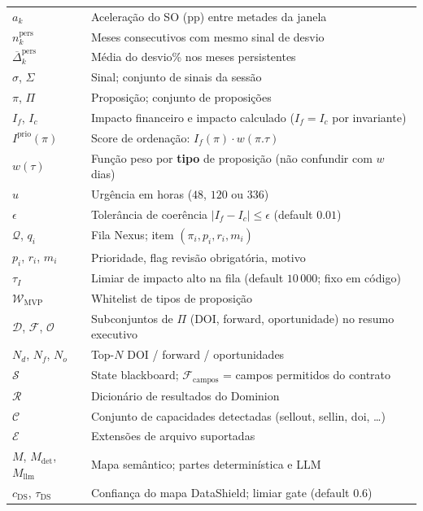 \documentclass[a4paper, 12pt]{report}
\theoremstyle{definition}
\theoremstyle{remark}
\newcommand{\state}{\mathcal{S}}
\newcommand{\fila}{\mathcal{Q}}
\begin{document}
\begin{longtable}{lp{9.5cm}}
  $a_k$ & Acelera\c{c}\~ao do SO (pp) entre metades da janela \\
  $n^{\text{pers}}_k$ & Meses consecutivos com mesmo sinal de desvio \\
  $\overline{\Delta}^{\text{pers}}_k$ & M\'edia do desvio\% nos meses persistentes \\
  $\sigma$, $\Sigma$ & Sinal; conjunto de sinais da sess\~ao \\
  $\pi$, $\Pi$ & Proposi\c{c}\~ao; conjunto de proposi\c{c}\~oes \\
  $I_f$, $I_c$ & Impacto financeiro e impacto calculado ($I_f = I_c$ por invariante) \\
  $I^{\text{prio}}(\pi)$ & Score de ordena\c{c}\~ao: $I_f(\pi)\cdot w(\pi.\tau)$ \\
  $w(\tau)$ & Fun\c{c}\~ao peso por \textbf{tipo} de proposi\c{c}\~ao (n\~ao confundir com $w$ dias) \\
  $u$ & Urg\^encia em horas ($48$, $120$ ou $336$) \\
  $\epsilon$ & Toler\^ancia de coer\^encia $|I_f-I_c|\leq\epsilon$ (default $0.01$) \\
  $\fila$, $q_i$ & Fila Nexus; item $(\pi_i, p_i, r_i, m_i)$ \\
  $p_i$, $r_i$, $m_i$ & Prioridade, flag revis\~ao obrigat\'oria, motivo \\
  $\tau_I$ & Limiar de impacto alto na fila (default $10\,000$; fixo em c\'odigo) \\
  $\mathcal{W}_{\text{MVP}}$ & Whitelist de tipos de proposi\c{c}\~ao \\
  $\mathcal{D}$, $\mathcal{F}$, $\mathcal{O}$ & Subconjuntos de $\Pi$ (DOI, forward, oportunidade)
    no resumo executivo \\
  $N_d$, $N_f$, $N_o$ & Top-$N$ DOI / forward / oportunidades \\
  $\state$ & State blackboard; $\mathcal{F}_{\text{campos}}$ = campos permitidos do contrato \\
  $\mathcal{R}$ & Dicion\'ario de resultados do Dominion \\
  $\mathcal{C}$ & Conjunto de capacidades detectadas (sellout, sellin, doi, \ldots) \\
  $\mathcal{E}$ & Extens\~oes de arquivo suportadas \\
  $M$, $M_{\text{det}}$, $M_{\text{llm}}$ & Mapa sem\^antico; partes determin\'istica e LLM \\
  $c_{\text{DS}}$, $\tau_{\text{DS}}$ & Confian\c{c}a do mapa DataShield; limiar gate (default $0.6$) \\

\end{longtable}
\end{document}
